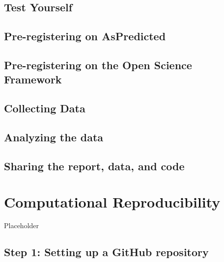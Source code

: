 \documentclass[
  oneside]{krantz}
\begin{document}
\hypertarget{test-yourself-11}{%
\subsection{Test Yourself}\label{test-yourself-11}}

\hypertarget{pre-registering-on-aspredicted}{%
\subsection{Pre-registering on
AsPredicted}\label{pre-registering-on-aspredicted}}

\hypertarget{pre-registering-on-the-open-science-framework}{%
\subsection{Pre-registering on the Open Science
Framework}\label{pre-registering-on-the-open-science-framework}}

\hypertarget{collecting-data}{%
\subsection{Collecting Data}\label{collecting-data}}

\hypertarget{analyzing-the-data}{%
\subsection{Analyzing the data}\label{analyzing-the-data}}

\hypertarget{sharing-the-report-data-and-code}{%
\subsection{Sharing the report, data, and
code}\label{sharing-the-report-data-and-code}}

\hypertarget{computationalreproducibility}{%
\section{Computational
Reproducibility}\label{computationalreproducibility}}

Placeholder

\hypertarget{step-1-setting-up-a-github-repository}{%
\subsection{Step 1: Setting up a GitHub
repository}\label{step-1-setting-up-a-github-repository}}
\end{document}
